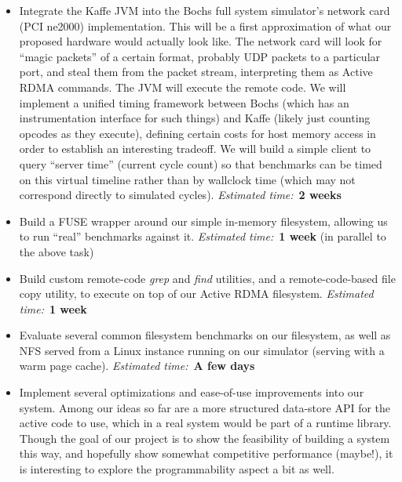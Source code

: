 \documentclass[10pt]{article}
\begin{document}
\begin{itemize}
\item Integrate the Kaffe JVM into the Bochs full system simulator's
  network card (PCI ne2000) implementation. This will be a first
  approximation of what our proposed hardware would actually look
  like. The network card will look for ``magic packets'' of a certain
  format, probably UDP packets to a particular port, and steal them
  from the packet stream, interpreting them as Active RDMA
  commands. The JVM will execute the remote code. We will implement a
  unified timing framework between Bochs (which has an instrumentation
  interface for such things) and Kaffe (likely just counting opcodes
  as they execute), defining certain costs for host memory access in
  order to establish an interesting tradeoff. We will build a simple
  client to query ``server time'' (current cycle count) so that
  benchmarks can be timed on this virtual timeline rather than by
  wallclock time (which may not correspond directly to simulated
  cycles). \emph{Estimated time:}~\textbf{2 weeks}

\item Build a FUSE wrapper around our simple in-memory filesystem,
  allowing us to run ``real'' benchmarks against it. \emph{Estimated
    time:}~\textbf{1 week} (in parallel to the above task)

\item Build custom remote-code \emph{grep} and \emph{find} utilities,
  and a remote-code-based file copy utility, to execute on top of our
  Active RDMA filesystem. \emph{Estimated time:}~\textbf{1 week}

\item Evaluate several common filesystem benchmarks on our filesystem,
  as well as NFS served from a Linux instance running on our simulator
  (serving with a warm page cache). \emph{Estimated time:}~\textbf{A
    few days}

\item Implement several optimizations and ease-of-use improvements
  into our system. Among our ideas so far are a more structured
  data-store API for the active code to use, which in a real system
  would be part of a runtime library. Though the goal of our project
  is to show the feasibility of building a system this way, and
  hopefully show somewhat competitive performance (maybe!), it is
  interesting to explore the programmability aspect a bit as well.

\end{itemize}
\end{document}
